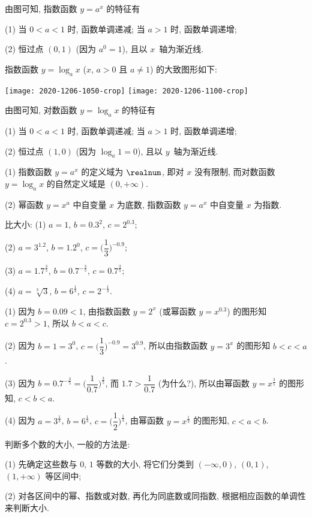 由图可知, 指数函数 $y= a^x$ 的特征有

(1) 当 $0<a<1$ 时, 函数单调递减; 当 $a>1$ 时, 函数单调递增;
 
(2) 恒过点 $(0,1)$ (因为 $a^0=1$), 且以 $x$~轴为渐近线.

指数函数 $y= \log_a x$ ($x$, $a>0$ 且 $a\neq 1$) 的大致图形如下:

    \begin{center}
        \texttt{[image: 2020-1206-1050-crop]}\qquad
        \texttt{[image: 2020-1206-1100-crop]}
    \end{center}

由图可知, 对数函数 $y= \log_a x$ 的特征有

(1) 当 $0<a<1$ 时, 函数单调递减; 当 $a>1$ 时, 函数单调递增;
 
(2) 恒过点 $(1,0)$ (因为 $\log_a 1=0$), 且以 $y$~轴为渐近线.

\begin{remark}
    (1) 指数函数 $y= a^x$ 的定义域为 $\realnum$, 即对 $x$ 没有限制, 而对数函数 $y= \log_a x$ 的自然定义域是 $(0,+\infty)$.
    
    (2) 幂函数 $y= x^a$ 中自变量 $x$ 为底数, 指数函数 $y= a^x$ 中自变量 $x$ 为指数. 
\end{remark}

\begin{example}
    比大小: (1) $a=1$, $b=0.3^2$, $c=2^{0.3}$;
    
    (2) $a= 3^{1.2}$, $b=1.2^0$, $c= \biggl(\dfrac13\biggr)^{-0.9}$;
    
    (3) $a=1.7^{\frac35}$, $b=0.7^{-\frac35}$, $c=0.7^{\frac35}$;
    
    (4) $a=\sqrt[3]{3}$, $b=6^{\frac13}$, $c=2^{-\frac13}$.
\end{example}
\begin{solution}
    (1) 因为 $b=0.09<1$, 由指数函数 $y=2^x$ (或幂函数 $y=x^{0.3}$) 的图形知 $c=2^{0.3}>1$, 所以 $b<a<c$.
    
    (2) 因为 $b=1=3^0$, $c= \biggl(\dfrac13\biggr)^{-0.9}= 3^{0.9}$, 所以由指数函数 $y=3^x$ 的图形知 $b<c<a$.
    
    (3) 因为 $b=0.7^{-\frac35}= \biggl(\dfrac1{0.7}\biggr)^{\frac35}$, 而 $1.7> \dfrac1{0.7}$ (为什么?), 所以由幂函数 $y= x^{\frac35}$ 的图形知, $c<b<a$.
    
    (4) 因为 $a=3^{\frac13}$, $b=6^{\frac13}$, $c=\biggl(\dfrac12\biggr)^{\frac13}$, 由幂函数 $y= x^{\frac13}$ 的图形知, $c<a<b$.
\end{solution}

判断多个数的大小, 一般的方法是:

(1) 先确定这些数与 $0$, $1$ 等数的大小, 将它们分类到 $(-\infty,0)$, $(0,1)$, $(1,+\infty)$ 等区间中;

(2) 对各区间中的幂、指数或对数, 再化为同底数或同指数, 根据相应函数的单调性来判断大小.